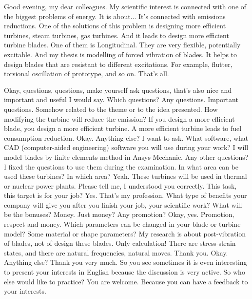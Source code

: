 \documentclass[main.tex]{subfiles}
\begin{document}
Good evening, my dear colleagues.
My scientific interest is connected with one of the biggest problems of energy.
It is about...
It's connected with emissions reductions.
One of the solutions of this problem is designing more efficient turbines, steam turbines, gas turbines.
And it leads to design more efficient turbine blades.
One of them is Longitudinal.
They are very flexible, potentially excitable.
And my thesis is modelling of forced vibration of blades.
It helps to design blades that are resistant to different excitations.
For example, flutter, torsional oscillation of prototype, and so on.
That's all.

Okay, questions, questions, make yourself ask questions, that's also nice and important and useful I would say.
Which questions? Any questions.
Important questions.
Somehow related to the theme or to the idea presented.
How modifying the turbine will reduce the emission?
If you design a more efficient blade, you design a more efficient turbine.
A more efficient turbine leads to fuel consumption reduction.
Okay.
Anything else?
I want to ask.
What software, what CAD (computer-aided engineering) software you will use during your work?
I will model blades by finite elements method in Ansys Mechanic.
Any other questions? I fixed the questions to use them during the examination.
In what area can be used these turbines?
In which area?
Yeah.
These turbines will be used in thermal or nuclear power plants.
Please tell me, I understood you correctly.
This task, this target is for your job?
Yes.
That's my profession.
What type of benefits your company will give you after you finish your job, your scientific work?
What will be the bonuses?
Money.
Just money?
Any promotion?
Okay, yes.
Promotion, respect and money.
Which parameters can be changed in your blade or turbine model?
Some material or shape parameters?
My research is about post-vibration of blades, not of design these blades.
Only calculation!
There are stress-strain states, and there are natural frequencies, natural moves.
Thank you.
Okay.
Anything else? Thank you very much.
So you see sometimes it is even interesting to present your interests in English because the discussion is very active.
So who else would like to practice?
You are welcome.
Because you can have a feedback to your interests.
\end{document}
